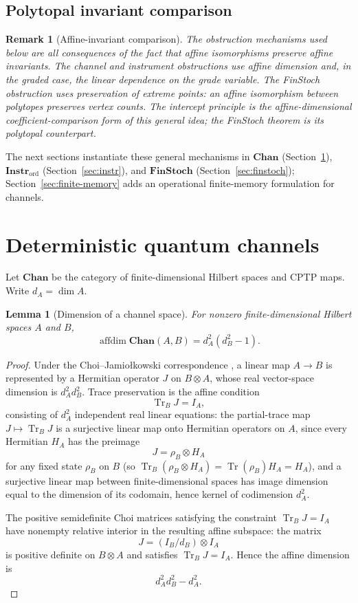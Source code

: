 \documentclass[11pt]{article}
\newtheorem{lemma}[theorem]{Lemma}
\newtheorem{remark}[theorem]{Remark}
\DeclareMathOperator{\affdim}{affdim}
\DeclareMathOperator{\Tr}{Tr}
\begin{document}
\subsection{Polytopal invariant comparison}

\begin{remark}[Affine-invariant comparison]
\label{rem:polytopal-companion}
The obstruction mechanisms used below are all consequences of the fact that
affine isomorphisms preserve affine invariants. The channel and instrument
obstructions use affine dimension and, in the graded case, the linear
dependence on the grade variable. The FinStoch obstruction uses preservation
of extreme points: an affine isomorphism between polytopes preserves vertex
counts. The intercept principle is the affine-dimensional
coefficient-comparison form of this general idea; the FinStoch theorem is
its polytopal counterpart.
\end{remark}

The next sections instantiate these general mechanisms in
$\mathbf{Chan}$ (Section~\ref{sec:chan}),
$\mathbf{Instr}_{\mathrm{ord}}$ (Section~\ref{sec:instr}), and
$\mathbf{FinStoch}$ (Section~\ref{sec:finstoch});
Section~\ref{sec:finite-memory} adds an operational finite-memory
formulation for channels.
\section{Deterministic quantum channels}
\label{sec:chan}

Let $\mathbf{Chan}$ be the category of finite-dimensional Hilbert spaces
and CPTP maps. Write $d_A=\dim A$.

\begin{lemma}[Dimension of a channel space]
\label{lem:chan-dim}
For nonzero finite-dimensional Hilbert spaces $A$ and $B$,
\[
\affdim\mathbf{Chan}(A,B)=d_A^2(d_B^2-1).
\]
\end{lemma}

\begin{proof}
Under the Choi--Jamio\l{}kowski correspondence
\cite{Choi1975, Jamiolkowski1972}, a linear map $A\to B$ is represented by a
Hermitian operator $J$ on $B\otimes A$, whose real vector-space dimension is
$d_A^2d_B^2$. Trace preservation is the affine condition
\[
\Tr_B J=I_A,
\]
consisting of $d_A^2$ independent real linear equations: the partial-trace
map $J\mapsto\Tr_B J$ is a surjective linear map onto Hermitian operators on
$A$, since every Hermitian $H_A$ has the preimage
\[
J=\rho_B\otimes H_A
\]
for any fixed state $\rho_B$ on $B$ (so
$\Tr_B(\rho_B\otimes H_A)=\Tr(\rho_B)H_A=H_A$), and a surjective linear map
between finite-dimensional spaces has image dimension equal to the dimension
of its codomain, hence kernel of codimension $d_A^2$.

The positive semidefinite Choi matrices satisfying the constraint
$\Tr_B J=I_A$ have nonempty relative interior in the resulting affine
subspace: the matrix
\[
J=(I_B/d_B)\otimes I_A
\]
is positive definite on $B\otimes A$ and satisfies $\Tr_B J=I_A$. Hence the
affine dimension is
\[
d_A^2d_B^2-d_A^2.
\]
\end{proof}
\end{document}
